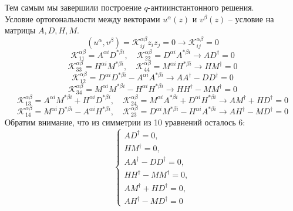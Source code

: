 \documentclass[12pt]{article}
\theoremstyle{definition}
\begin{document}
Тем самым мы завершили построение $q$-антиинстантонного решения.\\
Условие ортогональности между векторами $u^\alpha(z)$ и $v^\beta(z)$ -- условие на матрицы $A,D,H,M$.
\begin{equation}
    (u^\alpha,v^\beta)=\mathcal{K}^{\alpha\beta}_{ij}z_iz_j=0\rightarrow\mathcal{K}^{\alpha\beta}_{ij}=0
\end{equation}
\begin{equation}
    \mathcal{K}^{\alpha\beta}_{11}=A^{\alpha i}D^{*\beta i},\quad\mathcal{K}^{\alpha\beta}_{22}=D^{\alpha i}A^{*\beta i}\rightarrow AD^\dagger=0
\end{equation}
\begin{equation}
    \mathcal{K}^{\alpha\beta}_{33}=H^{\alpha i}M^{*\beta i},\quad\mathcal{K}^{\alpha\beta}_{44}=M^{\alpha i}H^{*\beta i}\rightarrow HM^\dagger=0
\end{equation}
\begin{equation}
    \mathcal{K}^{\alpha\beta}_{12}=D^{\alpha i}D^{*\beta i}-A^{\alpha i}A^{*\beta i}\rightarrow AA^\dagger-DD^\dagger=0
\end{equation}
\begin{equation}
    \mathcal{K}^{\alpha\beta}_{34}=M^{\alpha i}M^{*\beta i}-H^{\alpha i}H^{*\beta i}\rightarrow HH^\dagger-MM^\dagger=0
\end{equation}
\begin{equation}
    \mathcal{K}^{\alpha\beta}_{13}=A^{\alpha i}M^{*\beta i}+H^{\alpha i}D^{*\beta i},\quad\mathcal{K}^{\alpha\beta}_{24}=M^{\alpha i}A^{*\beta i}+D^{\alpha i}H^{*\beta i}\rightarrow AM^\dagger+HD^\dagger=0
\end{equation}
\begin{equation}
    \mathcal{K}^{\alpha\beta}_{14}=M^{\alpha i}D^{*\beta i}-A^{\alpha i}H^{*\beta i},\quad\mathcal{K}^{\alpha\beta}_{23}=D^{\alpha i}M^{*\beta i}-H^{\alpha i}A^{*\beta i}\rightarrow AH^\dagger-MD^\dagger=0
\end{equation}
Обратим внимание, что из симметрии из 10 уравнений осталось 6:
\begin{equation}
    \begin{cases}
        AD^\dagger=0,\\
        HM^\dagger=0,\\
        AA^\dagger-DD^\dagger=0,\\
        HH^\dagger-MM^\dagger=0,\\
        AM^\dagger+HD^\dagger=0,\\
        AH^\dagger-MD^\dagger=0
    \end{cases}
\end{equation}
\end{document}

